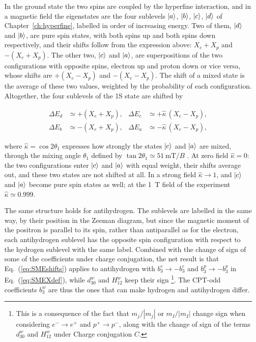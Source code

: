 In the ground state the two spins are coupled by the hyperfine interaction, and in a magnetic field the eigenstates are the four sublevels $\ket{a}$, $\ket{b}$, $\ket{c}$, $\ket{d}$ of Chapter~\ref{ch:hyperfine}, labelled in order of increasing energy. Two of them, $\ket{d}$ and $\ket{b}$, are pure spin states, with both spins up and both spins down respectively, and their shifts follow from the expression above: $X_e + X_p$ and $-(X_e + X_p)$. The other two, $\ket{c}$ and $\ket{a}$, are superpositions of the two configurations with opposite spins, electron up and proton down or vice versa, whose shifts are $+(X_e - X_p)$ and $-(X_e - X_p)$. The shift of a mixed state is the average of these two values, weighted by the probability of each configuration. Altogether, the four sublevels of the 1S state are shifted by \cite{Bluhm_1999}

\begin{align}
\Delta E_d &\simeq + (X_e + X_p), & \Delta E_c &\simeq + \hat\kappa \, (X_e - X_p), \nonumber \\
\Delta E_b &\simeq - (X_e + X_p), & \Delta E_a &\simeq - \hat\kappa \, (X_e - X_p),
\label{eq:SMEshifts}
\end{align}

where $\hat\kappa = \cos 2\theta_1$ expresses how strongly the states $\ket{c}$ and $\ket{a}$ are mixed, through the mixing angle $\theta_1$ defined by $\tan 2\theta_1 \simeq \SI{51}{\milli\tesla}/B$ \cite{Bluhm_1999}. At zero field $\hat\kappa = 0$: the two configurations enter $\ket{c}$ and $\ket{a}$ with equal weight, their shifts average out, and these two states are not shifted at all. In a strong field $\hat\kappa \to 1$, and $\ket{c}$ and $\ket{a}$ become pure spin states as well; at the \SI{1}{\tesla} field of the experiment $\hat\kappa \simeq 0.999$.

The same structure holds for antihydrogen. The sublevels are labelled in the same way, by their position in the Zeeman diagram, but since the magnetic moment of the positron is parallel to its spin, rather than antiparallel as for the electron, each antihydrogen sublevel has the opposite spin configuration with respect to the hydrogen sublevel with the same label. Combined with the change of sign of some of the coefficients under charge conjugation, the net result is that Eq.~(\ref{eq:SMEshifts}) applies to antihydrogen with $b^e_3 \to -b^e_3$ and $b^p_3 \to -b^p_3$ in Eq.~(\ref{eq:SMEXdef}), while $d^w_{30}$ and $H^w_{12}$ keep their sign \cite{Bluhm_1999} \footnote{This is a consequence of the fact that $m_{j}/|m_{j}|$ or $m_{I}/|m_{I}|$ change sign when considering $e^{-} \rightarrow e^{+}$ and $p^{+} \rightarrow p^{-}$, along with the change of sign of the terms $d^{w}_{30}$ and $H^{w}_{12}$ under Charge conjugation $C$.}. The CPT-odd coefficients $b^w_3$ are thus the ones that can make hydrogen and antihydrogen differ.


